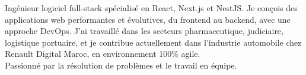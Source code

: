 \par{
Ingénieur logiciel full-stack spécialisé en React, Next.js et NestJS. Je conçois des applications web performantes et évolutives, du frontend au backend, avec une approche DevOps. J'ai travaillé dans les secteurs pharmaceutique, judiciaire, logistique portuaire, et je contribue actuellement dans l'industrie automobile chez Renault Digital Maroc, en environnement 100\% agile.\\
Passionné par la résolution de problèmes et le travail en équipe.\\
}

